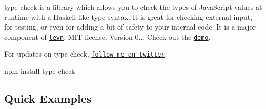 \label{_type-check}%


{\ttfamily type-\/check} is a library which allows you to check the types of Java\+Script values at runtime with a Haskell like type syntax. It is great for checking external input, for testing, or even for adding a bit of safety to your internal code. It is a major component of \href{https://github.com/gkz/levn}{\tt levn}. M\+I\+T license. Version 0... Check out the \href{http://gkz.github.io/type-check/}{\tt demo}.

For updates on {\ttfamily type-\/check}, \href{https://twitter.com/gkzahariev}{\tt follow me on twitter}. \begin{DoxyVerb}npm install type-check
\end{DoxyVerb}


\subsection*{Quick Examples}


